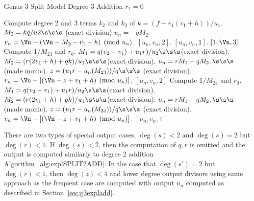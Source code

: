 \begin{subroutine}
\caption{Genus 3 Split Model Degree 3 Addition $r_1 = 0$ \label{sub:g3explSPLIT3ADDr1}}
\begin{algorithmic} [1]
\State Compute degree 2 and 3 terms $k_2$ and $k_3$ of $k = (f - v_1(v_1 +h))/u_1$.
    \State $M_2 = kq/u2 \s\s\s$ (exact division)
    \State $u_n = -qM_2$
    \State $v_n = \Vn - (\Vn - M_2 -v_1 - h) \pmod{u_n}$.
     \hspace{3pt} \Return $[u_n,v_n,2]$.
    \Else \hspace{55pt} \Return $[u_n,v_n,1]$.
    \EndIf
\Else
         \Return $[1,\Vn,3]$
        \Else
            \State Compute $1/M_{23}$ and $r_0$.
            \State $M_1 = q(v_2 - v_1) + u_1r)/u_2 \s\s\s $(exact division).
            \State $M_2 = (r(2v_1 + h) + qk)/u_1 \s\s\s $(exact division).
            \State $u_n = rM_1 - qM_2, \s\s\s $ (made monic).
            \State $z = (u_1r - u_n(M_{23}))/q \s\s\s$ (exact division).
            \State $v_n = \Vn - [(\Vn - z + v_1 + h) \pmod{u_n}]$.
            \State \Return $[u_n,v_n,2]$
        \EndIf
    \EndIf
    \State Compute $1/M_{24}$ and $r_0$.
    \State $M_1 = q(v_2 - v_1) + u_1r)/u_2 \s\s\s $(exact division).
    \State $M_2 = (r(2v_1 + h) + qk)/u_1 \s\s\s $(exact division).
    \State $u_n = rM_1 - qM_2, \s\s\s $ (made monic).
    \State $z = (u_1r - u_n(M_{24}))/q \s\s\s$ (exact division).
    \State $v_n = \Vn - [(\Vn - z + v_1 + h) \pmod{u_n}]$.
    \State \Return $[u_n,v_n,1]$
\EndIf
\end{algorithmic}
\end{subroutine}
There are two types of special output cases, $\deg(s) < 2$ and $\deg(s) = 2$ but
$\deg(r) < 1$. If $\deg(s) < 2$, then the computation of $q,r$ is omitted and
the output is computed similarly to degree 2 addition
Algorithm~\ref{alg:explSPLIT2ADD}.  In the case that $\deg(s') = 2$ but $\deg(r)
< 1$, then $\deg(z) < 4$ and lower degree output divisors using same approach as
the frequent case are computed with output $n_n$ computed as described in
Section~\ref{sec:g3expladd}. 


